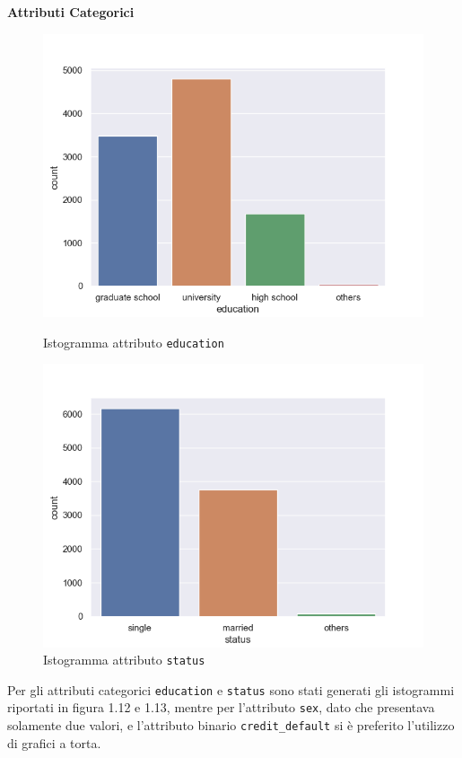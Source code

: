 \textbf{Attributi Categorici}
\begin{figure}[!htb]
  \includegraphics[width=\linewidth]{img/education-hist.png}
  \caption{Istogramma attributo \texttt{education}}\label{edu-dist}
\endminipage\hfill
{}
  \includegraphics[width=\linewidth]{img/status-hist.png}
  \caption{Istogramma attributo \texttt{status}}\label{status-dist}
\endminipage\hfill
\end{figure}

Per gli attributi categorici \texttt{education} e \texttt{status}
sono stati generati gli istogrammi riportati in figura 1.12 e 1.13,
mentre per l'attributo \texttt{sex}, dato che presentava solamente
due valori, e l'attributo binario \texttt{credit\_default} si \`e
preferito l'utilizzo di grafici a torta.


